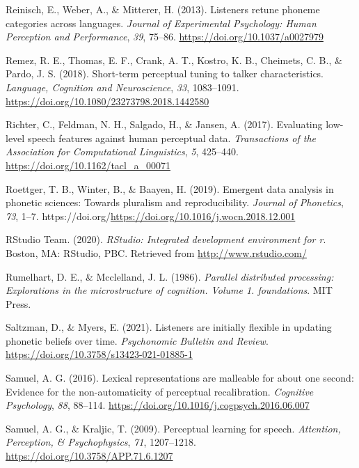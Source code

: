 \documentclass[
  11pt,
  man,floatsintext]{apa6}
\newlength{\cslhangindent}
\newlength{\cslentryspacingunit} %
\newenvironment{CSLReferences}[2] %
 {%
  \setlength{\parindent}{0pt}
  \ifodd #1
  \let\oldpar\par
  \def\par{\hangindent=\cslhangindent\oldpar}
  \fi
  \setlength{\parskip}{#2\cslentryspacingunit}
 }%
 {}
\begin{document}
\begin{CSLReferences}{1}{0}
\leavevmode{}%
Reinisch, E., Weber, A., \& Mitterer, H. (2013). Listeners retune phoneme categories across languages. \emph{Journal of Experimental Psychology: Human Perception and Performance}, \emph{39}, 75--86. \url{https://doi.org/10.1037/a0027979}

\leavevmode{}%
Remez, R. E., Thomas, E. F., Crank, A. T., Kostro, K. B., Cheimets, C. B., \& Pardo, J. S. (2018). Short-term perceptual tuning to talker characteristics. \emph{Language, Cognition and Neuroscience}, \emph{33}, 1083--1091. \url{https://doi.org/10.1080/23273798.2018.1442580}

\leavevmode{}%
Richter, C., Feldman, N. H., Salgado, H., \& Jansen, A. (2017). Evaluating low-level speech features against human perceptual data. \emph{Transactions of the Association for Computational Linguistics}, \emph{5}, 425--440. \url{https://doi.org/10.1162/tacl_a_00071}

\leavevmode{}%
Roettger, T. B., Winter, B., \& Baayen, H. (2019). Emergent data analysis in phonetic sciences: Towards pluralism and reproducibility. \emph{Journal of Phonetics}, \emph{73}, 1--7. https://doi.org/\url{https://doi.org/10.1016/j.wocn.2018.12.001}

\leavevmode{}%
RStudio Team. (2020). \emph{RStudio: Integrated development environment for r}. Boston, MA: RStudio, PBC. Retrieved from \url{http://www.rstudio.com/}

\leavevmode{}%
Rumelhart, D. E., \& Mcclelland, J. L. (1986). \emph{Parallel distributed processing: Explorations in the microstructure of cognition. Volume 1. foundations}. MIT Press.

\leavevmode{}%
Saltzman, D., \& Myers, E. (2021). Listeners are initially flexible in updating phonetic beliefs over time. \emph{Psychonomic Bulletin and Review}. \url{https://doi.org/10.3758/s13423-021-01885-1}

\leavevmode{}%
Samuel, A. G. (2016). Lexical representations are malleable for about one second: Evidence for the non-automaticity of perceptual recalibration. \emph{Cognitive Psychology}, \emph{88}, 88--114. \url{https://doi.org/10.1016/j.cogpsych.2016.06.007}

\leavevmode{}%
Samuel, A. G., \& Kraljic, T. (2009). Perceptual learning for speech. \emph{Attention, Perception, \& Psychophysics}, \emph{71}, 1207--1218. \url{https://doi.org/10.3758/APP.71.6.1207}


\end{CSLReferences}
\end{document}
